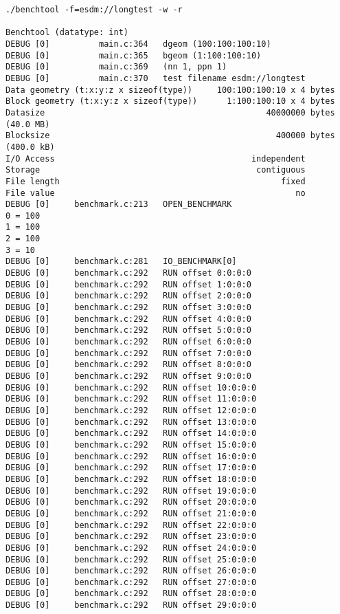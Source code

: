 \begin{verbatim}
./benchtool -f=esdm://longtest -w -r

Benchtool (datatype: int)
DEBUG [0]          main.c:364   dgeom (100:100:100:10)
DEBUG [0]          main.c:365   bgeom (1:100:100:10)
DEBUG [0]          main.c:369   (nn 1, ppn 1)
DEBUG [0]          main.c:370   test filename esdm://longtest
Data geometry (t:x:y:z x sizeof(type))     100:100:100:10 x 4 bytes
Block geometry (t:x:y:z x sizeof(type))      1:100:100:10 x 4 bytes
Datasize                                             40000000 bytes                (40.0 MB)
Blocksize                                              400000 bytes                (400.0 kB)
I/O Access                                        independent
Storage                                            contiguous
File length                                             fixed
File value                                                 no
DEBUG [0]     benchmark.c:213   OPEN_BENCHMARK
0 = 100
1 = 100
2 = 100
3 = 10
DEBUG [0]     benchmark.c:281   IO_BENCHMARK[0]
DEBUG [0]     benchmark.c:292   RUN offset 0:0:0:0
DEBUG [0]     benchmark.c:292   RUN offset 1:0:0:0
DEBUG [0]     benchmark.c:292   RUN offset 2:0:0:0
DEBUG [0]     benchmark.c:292   RUN offset 3:0:0:0
DEBUG [0]     benchmark.c:292   RUN offset 4:0:0:0
DEBUG [0]     benchmark.c:292   RUN offset 5:0:0:0
DEBUG [0]     benchmark.c:292   RUN offset 6:0:0:0
DEBUG [0]     benchmark.c:292   RUN offset 7:0:0:0
DEBUG [0]     benchmark.c:292   RUN offset 8:0:0:0
DEBUG [0]     benchmark.c:292   RUN offset 9:0:0:0
DEBUG [0]     benchmark.c:292   RUN offset 10:0:0:0
DEBUG [0]     benchmark.c:292   RUN offset 11:0:0:0
DEBUG [0]     benchmark.c:292   RUN offset 12:0:0:0
DEBUG [0]     benchmark.c:292   RUN offset 13:0:0:0
DEBUG [0]     benchmark.c:292   RUN offset 14:0:0:0
DEBUG [0]     benchmark.c:292   RUN offset 15:0:0:0
DEBUG [0]     benchmark.c:292   RUN offset 16:0:0:0
DEBUG [0]     benchmark.c:292   RUN offset 17:0:0:0
DEBUG [0]     benchmark.c:292   RUN offset 18:0:0:0
DEBUG [0]     benchmark.c:292   RUN offset 19:0:0:0
DEBUG [0]     benchmark.c:292   RUN offset 20:0:0:0
DEBUG [0]     benchmark.c:292   RUN offset 21:0:0:0
DEBUG [0]     benchmark.c:292   RUN offset 22:0:0:0
DEBUG [0]     benchmark.c:292   RUN offset 23:0:0:0
DEBUG [0]     benchmark.c:292   RUN offset 24:0:0:0
DEBUG [0]     benchmark.c:292   RUN offset 25:0:0:0
DEBUG [0]     benchmark.c:292   RUN offset 26:0:0:0
DEBUG [0]     benchmark.c:292   RUN offset 27:0:0:0
DEBUG [0]     benchmark.c:292   RUN offset 28:0:0:0
DEBUG [0]     benchmark.c:292   RUN offset 29:0:0:0

\end{verbatim}
